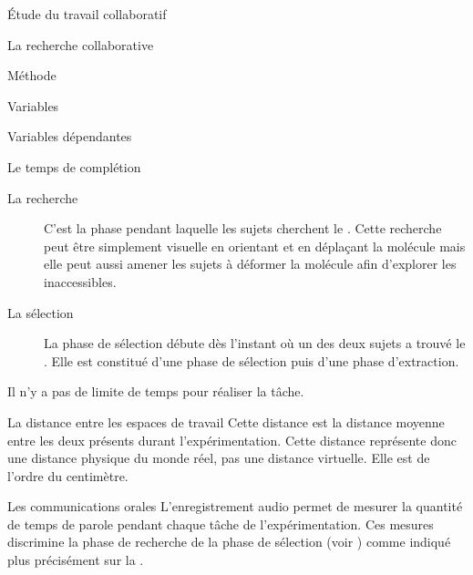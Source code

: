\documentclass[myfrancais]{mythesis}
\begin{document}
\begin{mypart}{Étude du travail collaboratif}
\begin{mychapter}{La recherche collaborative}
\begin{mysection}{Méthode}
\begin{mysubsection}{Variables}
\begin{mysubsubsection}{Variables dépendantes}
\begin{myparagraph}{ Le temps de complétion}
\begin{description}
								\item[La recherche] C'est la phase pendant laquelle les sujets cherchent le .
									Cette recherche peut être simplement visuelle en orientant et en déplaçant la molécule mais elle peut aussi amener les sujets à déformer la molécule afin d'explorer les  inaccessibles.
								\item[La sélection] La phase de sélection débute dès l'instant où un des deux sujets a trouvé le .
									Elle est constitué d'une phase de sélection puis d'une phase d'extraction.
							\end{description}
							Il n'y a pas de limite de temps pour réaliser la tâche.
						\end{myparagraph}
						\begin{myparagraph}{ La distance entre les espaces de travail}
							Cette distance est la distance moyenne entre les deux  présents durant l'expérimentation.
							Cette distance représente donc une distance physique du monde réel, pas une distance virtuelle.
							Elle est de l'ordre du centimètre.
						\end{myparagraph}
						\begin{myparagraph}{ Les communications orales}
							L'enregistrement audio permet de mesurer la quantité de temps de parole pendant chaque tâche de l'expérimentation.
							Ces mesures discrimine la phase de recherche de la phase de sélection (voir ) comme indiqué plus précisément sur la .


\end{myparagraph}
\end{mysubsubsection}
\end{mysubsection}
\end{mysection}
\end{mychapter}
\end{mypart}
\end{document}

